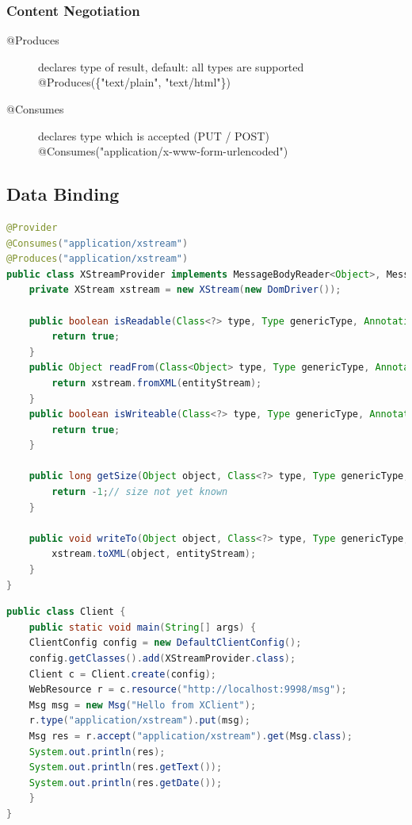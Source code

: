 \documentclass[10pt]{article}
\begin{document}
\subsubsection{Content Negotiation}
\begin{description}
	\item[@Produces] declares type of result, default: all types are supported \\
		@Produces(\{"{}text/plain", "{}text/html"\})
	\item[@Consumes] declares type which is accepted (PUT / POST) \\
		@Consumes("{}application/x-www-form-urlencoded")
\end{description}
\subsection{Data Binding}
\begin{lstlisting}[language=Java, caption=XStream Provider, style=JavaStyle]
@Provider
@Consumes("application/xstream")
@Produces("application/xstream")
public class XStreamProvider implements MessageBodyReader<Object>, MessageBodyWriter<Object>{
	private XStream xstream = new XStream(new DomDriver());
	
	public boolean isReadable(Class<?> type, Type genericType, Annotation[] annotations, MediaType mimeType) {
		return true;
	}
	public Object readFrom(Class<Object> type, Type genericType, Annotation[] annotations, MediaType mimeType, MultivaluedMap<String, String> httpHeaders, InputStream entityStream) {
		return xstream.fromXML(entityStream);
	}
	public boolean isWriteable(Class<?> type, Type genericType, Annotation[] ann, MediaType mimeType) {
		return true;
	}
	
	public long getSize(Object object, Class<?> type, Type genericType, Annotation[] ann, MediaType mimeType) {
		return -1;// size not yet known
	}
	
	public void writeTo(Object object, Class<?> type, Type genericType, Annotation[] ann, MediaType mimeType, MultivaluedMap<String, Object> httpHeaders, OutputStream entityStream) {
		xstream.toXML(object, entityStream);
	}
}
\end{lstlisting}
\begin{lstlisting}[language=Java, caption=XStream Example, style=JavaStyle]
public class Client {
	public static void main(String[] args) {
	ClientConfig config = new DefaultClientConfig();
	config.getClasses().add(XStreamProvider.class);
	Client c = Client.create(config);
	WebResource r = c.resource("http://localhost:9998/msg");
	Msg msg = new Msg("Hello from XClient");
	r.type("application/xstream").put(msg);
	Msg res = r.accept("application/xstream").get(Msg.class); 
	System.out.println(res);
	System.out.println(res.getText());
	System.out.println(res.getDate());
	}
}
\end{lstlisting}
\end{document}
